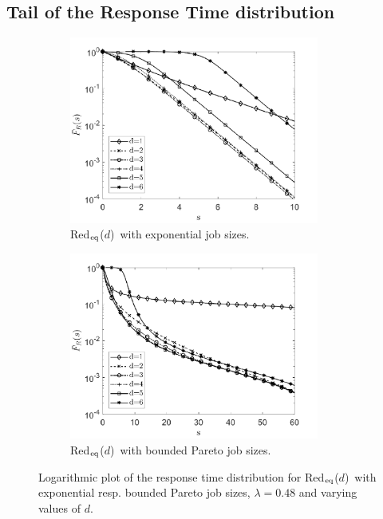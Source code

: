 \documentclass[12pt]{report}
\newcommand{\Redid}{Red$_{\textup{eq}}$($d$)}
\begin{document}
\subsection{Tail of the Response Time distribution}
\begin{figure}[t]
\begin{subfigure}{.45\textwidth}
\begin{center}
\includegraphics[width=0.9\textwidth]{figures/Chapter3/tail_expidvard.pdf}
\caption{\Redid\ with exponential job sizes.}
\label{fig:tail_expidvard}
\end{center}
\end{subfigure}
\begin{subfigure}{.45\textwidth}
\begin{center}
\includegraphics[width=0.9\textwidth]{figures/Chapter3/tail_BPidvard.pdf}
\caption{\Redid\ with bounded Pareto job sizes.}
\label{fig:tail_BPidvard}
\end{center}
\end{subfigure}
\caption{Logarithmic plot of the response time distribution for \Redid\ with exponential resp. bounded Pareto job sizes, $\lambda = 0.48$ and varying values of $d$.}
\label{fig:tail_id}
\end{figure}
\end{document}
